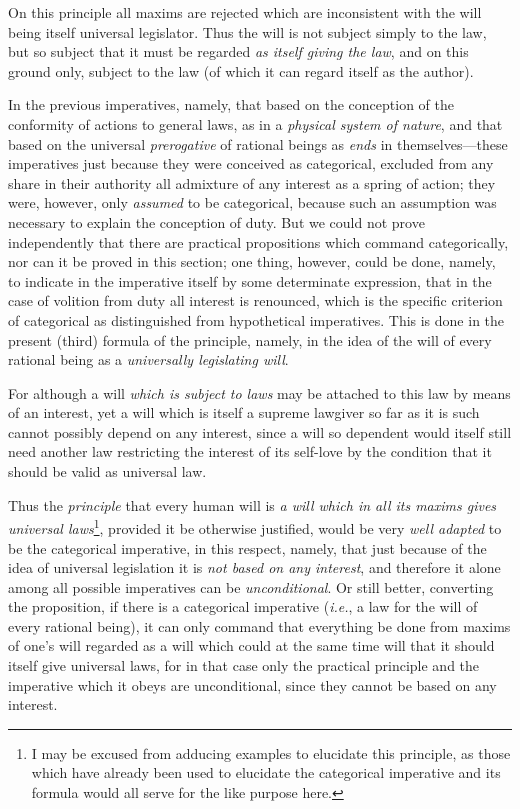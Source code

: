 On this principle all maxims are rejected which are inconsistent with
the will being itself universal legislator. Thus the will is not
subject simply to the law, but so subject that it must be regarded
\textit{as itself giving the law}, and on this ground only, subject to
the law (of which it can regard itself as the author).

In the previous imperatives, namely, that based on the conception of
the conformity of actions to general laws, as in a \textit{physical
system of nature}, and that based on the universal
\textit{prerogative} of rational beings as \textit{ends} in
themselves---these imperatives just because they were conceived as
categorical, excluded  from any share in their authority all
admixture of any interest as a spring of action; they were, however,
only \textit{assumed} to be categorical, because such an assumption
was necessary to explain the conception of duty. But we could not
prove independently that there are practical propositions which
command categorically, nor can it be proved in this section; one
thing, however, could be done, namely, to indicate in the imperative
itself by some determinate expression, that in the case of volition
from duty all interest is renounced, which is the specific criterion
of categorical as distinguished from hypothetical imperatives. This is
done in the present (third) formula of the principle, namely, in the
idea of the will of every rational being as a \textit{universally
legislating will}.

For although a will \textit{which is subject to laws} may be attached
to this law by means of an interest, yet a will which is itself a
supreme lawgiver so far as it is such cannot possibly depend on any
interest, since a will so dependent would itself still need another
law restricting the interest of its self-love by the condition that it
should be valid as universal law.

Thus the \textit{principle} that every human will is \textit{a will
which in all its maxims gives universal laws}\footnote{I may be
excused from adducing examples to elucidate this principle, as those
which have already been used to elucidate the categorical imperative
and its formula would all serve for the like purpose here.}, provided
it be otherwise justified, would be very \textit{well adapted} to be
the categorical imperative, in this respect, namely, that just because
of the idea of universal legislation it is \textit{not based on any
interest}, and therefore it alone among all possible imperatives can
be \textit{unconditional}. Or still better, converting the
proposition, if there is a categorical imperative (\textit{i.e.}, a
law for the will of every rational being), it can only command that
everything be done from maxims of one's will regarded as a will which
could at the same time will that it should itself give universal laws,
for in that case only the practical principle and the imperative which
it obeys are unconditional, since they cannot be based on any
interest.

